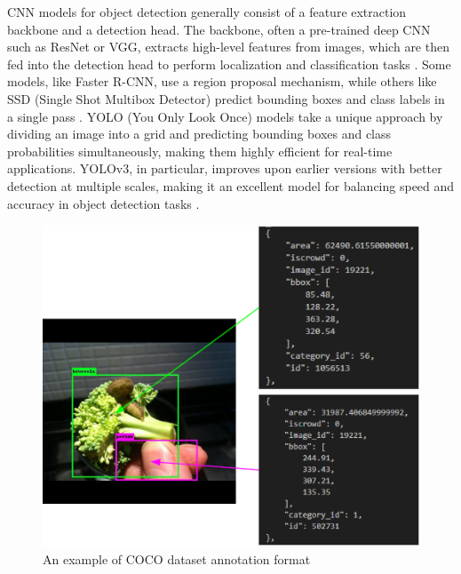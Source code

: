 \documentclass[journal,onecolumn,12pt]{IEEEtran}
\begin{document}

CNN models for object detection generally consist of a feature extraction backbone and a detection head. The backbone, often a pre-trained deep CNN such as ResNet or VGG, extracts high-level features from images, which are then fed into the detection head to perform localization and classification tasks \cite{he2015deepresiduallearningimage, simonyan2015deepconvolutionalnetworkslargescale}. Some models, like Faster R-CNN, use a region proposal mechanism, while others like SSD (Single Shot Multibox Detector) predict bounding boxes and class labels in a single pass \cite{ren2016fasterrcnnrealtimeobject, Liu_2016}. YOLO (You Only Look Once) models take a unique approach by dividing an image into a grid and predicting bounding boxes and class probabilities simultaneously, making them highly efficient for real-time applications. YOLOv3, in particular, improves upon earlier versions with better detection at multiple scales, making it an excellent model for balancing speed and accuracy in object detection tasks \cite{redmon2018yolov3incrementalimprovement}.

\begin{figure}
    \centering
    \captionsetup{justification=centering}
    \includegraphics[width=0.5\linewidth]{figures/label.PNG}
    \caption{An example of COCO dataset annotation format}
    \label{fig:coco}
\end{figure}
\end{document}
